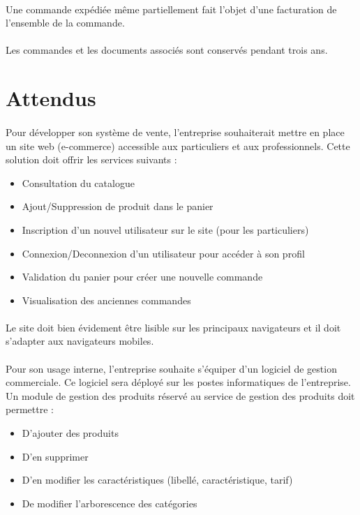 \documentclass{article}
\begin{document}
\paragraph{}
Une commande expédiée même partiellement fait l’objet d’une facturation de l’ensemble de la commande.
\par
\paragraph{}
Les commandes et les documents associés sont conservés pendant trois ans.
\par
\section{Attendus}
\paragraph{}
Pour développer son système de vente, l'entreprise souhaiterait mettre en place un site web (e-commerce) accessible aux particuliers et aux professionnels. Cette solution doit offrir les services suivants :
\par
\begin{itemize}
  \item Consultation du catalogue
  \item Ajout/Suppression de produit dans le panier
  \item Inscription d'un nouvel utilisateur sur le site (pour les particuliers)
  \item Connexion/Deconnexion d'un utilisateur pour accéder à son profil
  \item Validation du panier pour créer une nouvelle commande
  \item Visualisation des anciennes commandes
\end{itemize}
\paragraph{}
Le site doit bien évidement être lisible sur les principaux navigateurs et il doit s'adapter aux navigateurs mobiles.
\par
\paragraph{}
Pour son usage interne, l'entreprise souhaite s'équiper d'un logiciel de gestion commerciale. Ce logiciel sera déployé sur les postes informatiques de l'entreprise.
\\[1\baselineskip]
Un module de gestion des produits réservé au service de gestion des produits doit permettre :
\par
\begin{itemize}
  \item D’ajouter des produits
  \item D’en supprimer
  \item D’en modifier les caractéristiques (libellé, caractéristique, tarif)
  \item De modifier l'arborescence des catégories
\end{itemize}
\end{document}
